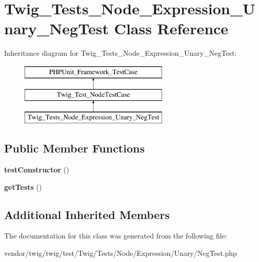 \hypertarget{classTwig__Tests__Node__Expression__Unary__NegTest}{}\section{Twig\+\_\+\+Tests\+\_\+\+Node\+\_\+\+Expression\+\_\+\+Unary\+\_\+\+Neg\+Test Class Reference}
\label{classTwig__Tests__Node__Expression__Unary__NegTest}
Inheritance diagram for Twig\+\_\+\+Tests\+\_\+\+Node\+\_\+\+Expression\+\_\+\+Unary\+\_\+\+Neg\+Test\+:\begin{figure}[H]
\begin{center}
\leavevmode
\includegraphics[height=3.000000cm]{classTwig__Tests__Node__Expression__Unary__NegTest}
\end{center}
\end{figure}
\subsection*{Public Member Functions}
\begin{DoxyCompactItemize}
\item 
{\bfseries test\+Constructor} ()\hypertarget{classTwig__Tests__Node__Expression__Unary__NegTest_aee229aaf6abcc34ba20b1c83667fd578}{}\label{classTwig__Tests__Node__Expression__Unary__NegTest_aee229aaf6abcc34ba20b1c83667fd578}

\item 
{\bfseries get\+Tests} ()\hypertarget{classTwig__Tests__Node__Expression__Unary__NegTest_afe7aadac1c2904e1af07f2a83dc09c46}{}\label{classTwig__Tests__Node__Expression__Unary__NegTest_afe7aadac1c2904e1af07f2a83dc09c46}

\end{DoxyCompactItemize}
\subsection*{Additional Inherited Members}


The documentation for this class was generated from the following file\+:\begin{DoxyCompactItemize}
\item 
vendor/twig/twig/test/\+Twig/\+Tests/\+Node/\+Expression/\+Unary/Neg\+Test.\+php\end{DoxyCompactItemize}

